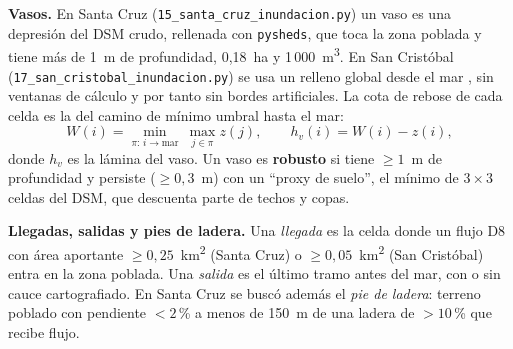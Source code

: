 \documentclass{sosg-informe}
\newcommand{\kmc}{km\textsuperscript{2}}
\newcommand{\mtres}{m\textsuperscript{3}}
\begin{document}
\textbf{Vasos.} En Santa Cruz (\texttt{15\_santa\_cruz\_inundacion.py}) un vaso es una depresión del DSM crudo, rellenada con \texttt{pysheds}, que toca la zona poblada y tiene más de 1~m de profundidad, 0,18~ha y 1\,000~\mtres. En San Cristóbal (\texttt{17\_san\_cristobal\_inundacion.py}) se usa un relleno global desde el mar \citep[\emph{priority-flood};][]{barnes2014pf}, sin ventanas de cálculo y por tanto sin bordes artificiales. La cota de rebose de cada celda es la del camino de mínimo umbral hasta el mar:
\begin{equation}
  W(i) = \min_{\pi:\, i \to \text{mar}}\ \max_{j \in \pi} z(j), \qquad h_v(i) = W(i) - z(i),
\end{equation}
donde $h_v$ es la lámina del vaso. Un vaso es \textbf{robusto} si tiene $\geq 1$~m de profundidad y persiste ($\geq 0{,}3$~m) con un \enquote{proxy de suelo}, el mínimo de $3\times 3$ celdas del DSM, que descuenta parte de techos y copas.

\textbf{Llegadas, salidas y pies de ladera.} Una \emph{llegada} es la celda donde un flujo D8 con área aportante $\geq 0{,}25$~\kmc{} (Santa Cruz) o $\geq 0{,}05$~\kmc{} (San Cristóbal) entra en la zona poblada. Una \emph{salida} es el último tramo antes del mar, con o sin cauce cartografiado. En Santa Cruz se buscó además el \emph{pie de ladera}: terreno poblado con pendiente $< 2$\,\% a menos de 150~m de una ladera de $> 10$\,\% que recibe flujo.
\end{document}
